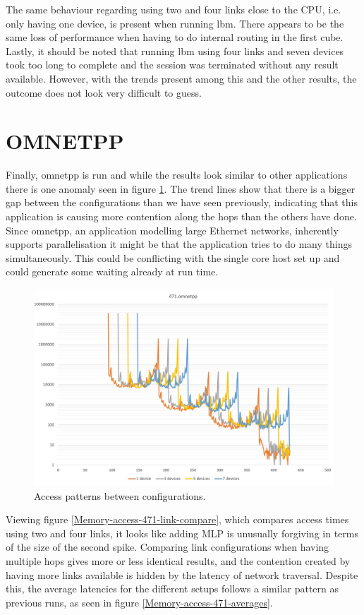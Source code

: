 The same behaviour regarding using two and four links close to the CPU, i.e. only having one device, is present when running lbm. There appears to be the same loss of performance when having to do internal routing in the first cube. Lastly, it should be noted that running lbm using four links and seven devices took too long to complete and the session was terminated without any result available. However, with the trends present among this and the other results, the outcome does not look very difficult to guess.

\section{OMNETPP}
Finally, omnetpp is run and while the results look similar to other applications there is one anomaly seen in figure \ref{Memory-access-471}. The trend lines show that there is a bigger gap between the configurations than we have seen previously, indicating that this application is causing more contention along the hops than the others have done. Since omnetpp, an application modelling large Ethernet networks, inherently supports parallelisation it might be that the application tries to do many things simultaneously. This could be conflicting with the single core host set up and could generate some waiting already at run time. 
\bigskip

\begin{figure}[!ht]
    \centering
    \includegraphics[width=1.0\linewidth]{figure/471-x_4.jpg}
    \caption{Access patterns between configurations.}
    \label{Memory-access-471}
\end{figure}

Viewing figure \ref{Memory-access-471-link-compare}, which compares access times using two and four links, it looks like adding MLP is unusually forgiving in terms of the size of the second spike. Comparing link configurations when having multiple hops gives more or less identical results, and the contention created by having more links available is hidden by the latency of network traversal. Despite this, the average latencies for the different setups follows a similar pattern as previous runs, as seen in figure \ref{Memory-access-471-averages}.

